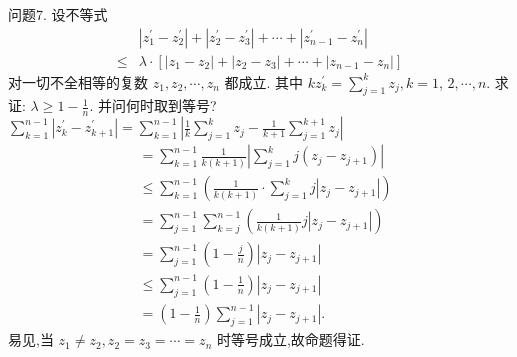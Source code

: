 问题7. 设不等式
$$
\begin{aligned}
& \left|z_1^{\prime}-z_2^{\prime}\right|+\left|z_2^{\prime}-z_3^{\prime}\right|+\cdots+\left|z_{n-1}^{\prime}-z_n^{\prime}\right| \\
\leqslant & \lambda \cdot\left[\left|z_1-z_2\right|+\left|z_2-z_3\right|+\cdots+\left|z_{n-1}-z_n\right|\right]
\end{aligned}
$$
对一切不全相等的复数 $z_1, z_2, \cdots, z_n$ 都成立.
其中 $k z_k^{\prime}=\sum_{j=1}^k z_j, k=1$, $2, \cdots, n$. 求证: $\lambda \geqslant 1-\frac{1}{n}$. 并问何时取到等号?
$\sum_{k=1}^{n-1}\left|z_k^{\prime}-z_{k+1}^{\prime}\right|=\sum_{k=1}^{n-1}\left|\frac{1}{k} \sum_{j=1}^k z_j-\frac{1}{k+1} \sum_{j=1}^{k+1} z_j\right|$
$$
\begin{aligned}
& =\sum_{k=1}^{n-1} \frac{1}{k(k+1)}\left|\sum_{j=1}^k j\left(z_j-z_{j+1}\right)\right| \\
& \leqslant \sum_{k=1}^{n-1}\left(\frac{1}{k(k+1)} \cdot \sum_{j=1}^k j\left|z_j-z_{j+1}\right|\right) \\
& =\sum_{j=1}^{n-1} \sum_{k=j}^{n-1}\left(\frac{1}{k(k+1)} j\left|z_j-z_{j+1}\right|\right) \\
& =\sum_{j=1}^{n-1}\left(1-\frac{j}{n}\right)\left|z_j-z_{j+1}\right| \\
& \leqslant \sum_{j=1}^{n-1}\left(1-\frac{1}{n}\right)\left|z_j-z_{j+1}\right| \\
& =\left(1-\frac{1}{n}\right) \sum_{j=1}^{n-1}\left|z_j-z_{j+1}\right| .
\end{aligned}
$$
易见,当 $z_1 \neq z_2, z_2=z_3=\cdots=z_n$ 时等号成立,故命题得证.



